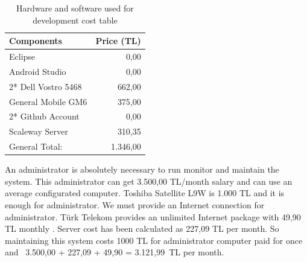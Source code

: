 \begin{table}[!h!]
\centering
\caption{Hardware and software used for development cost table}
\label{tab:hardsoftcost}
\begin{tabular}{|l|r|}
\hline
\textbf{Components}             & \multicolumn{1}{l|}{\textbf{Price (TL)}} \\ \hline
Eclipse \cite{eclipse} & 0,00 \\ \hline
Android Studio \cite{androidStudio} & 0,00 \\ \hline
2* Dell Vostro 5468 \cite{dell} & 662,00 \\ \hline
General Mobile GM6 \cite{gm6} & 375,00                            \\ \hline
2* Github Account                  & 0,00                            \\ \hline
Scaleway Server                  & 310,35                           \\ \hline
General Total:                  & 1.346,00                            \\ \hline
\end{tabular}
\end{table}

An administrator is absolutely necessary to run monitor and maintain the system. This administrator can get 3.500,00 TL/month salary and can use an average configurated computer. Toshiba Satellite L9W \cite{toshiba} is 1.000 TL and it is enough for administrator. We must provide an Internet connection for administrator. Türk Telekom provides an unlimited Internet package with 49,90 TL monthly \cite{ttnet}. Server cost has been calculated as 227,09 TL per month. So maintaining this system costs 1000 TL for administrator computer paid for once and \ 3.500,00 + 227,09 + 49,90 = 3.121,99\ TL per month.